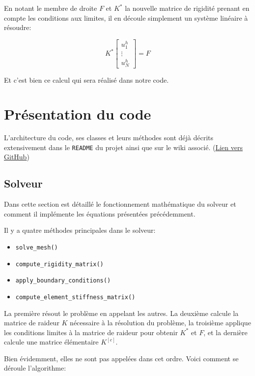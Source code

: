 \documentclass{article}
\begin{document}
En notant le membre de droite $F$ et $K^*$ la nouvelle
matrice de rigidité prenant en compte les conditions aux limites,
il en découle simplement un système linéaire à résoudre:

\begin{equation}
    K^*
    \begin{bmatrix}
        u^h_1 \\ \vdots \\ u^h_N
    \end{bmatrix}
    = F
\end{equation}

Et c'est bien ce calcul qui sera réalisé dans notre code.

\newpage

\section{Présentation du code}

L'architecture du code, ses classes et leurs
méthodes sont déjà décrits extensivement dans le \verb|README|
du projet ainsi que sur le wiki associé.
(\href{https://github.com/LuciferC-137/FiniteElementElec}{Lien vers GitHub})

\subsection{Solveur}

Dans cette section est détaillé le fonctionnement
mathématique du solveur et comment il implémente les équations
présentées précédemment.

Il y a quatre méthodes principales dans le solveur:

\begin{itemize}
    \item \verb|solve_mesh()|
    \item \verb|compute_rigidity_matrix()|
    \item \verb|apply_boundary_conditions()|
    \item \verb|compute_element_stiffness_matrix()|
\end{itemize}

La première résout le problème en appelant les autres.
La deuxième calcule la matrice de raideur $K$ nécessaire à la
résolution du problème, la troisième applique les conditions
limites à la matrice de raideur pour obtenir $K^*$ et $F$, et la dernière calcule
une matrice élémentaire $K^{[e]}$.

Bien évidemment, elles ne sont pas appelées dans cet ordre. Voici
comment se déroule l'algorithme:
\end{document}
